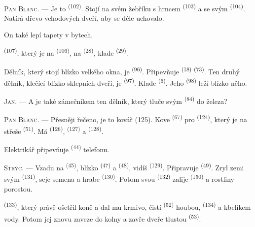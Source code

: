\VUsaut{3.0mm}
\VUsaut{3.0mm}

\textsc{Pan Blanc}. --- Je to  \textsuperscript{(102)}. Stojí na svém žebříku
s hrncem  \textsuperscript{(103)} a se svým 
\textsuperscript{(104)}. Natírá dřevo vchodových dveří, aby se déle uchovalo.

On také lepí tapety v bytech.

 \textsuperscript{(107)}, který je na 
\textsuperscript{(106)}, na  \textsuperscript{(28)}, klade
 \textsuperscript{(29)}.

Dělník, který stojí blízko velkého okna, je  \textsuperscript{(96)}.
Připevňuje  \textsuperscript{(18)} 
\textsuperscript{(73)}. Ten druhý dělník, klečící blízko sklepních dveří, je
 \textsuperscript{(97)}. Klade  \textsuperscript{(6)}.
Jeho  \textsuperscript{(98)} leží blízko něho.

\textsc{Jan}. --- A je také zámečníkem ten dělník, který tluče svým 
\textsuperscript{(84)} do železa?

\textsc{Pan Blanc}. --- Přesněji řečeno, je to kovář (125). Kove 
\textsuperscript{(67)} pro  \textsuperscript{(124)}, který je na střeše
 \textsuperscript{(51)}. Má  \textsuperscript{(126)},
 \textsuperscript{(127)} a
 \textsuperscript{(128)}.

Elektrikář připevňuje  \textsuperscript{(44)}  telefonu.

\VUsaut{3.0mm}

\textsc{Strýc}. --- Vzadu na  \textsuperscript{(45)}, blízko
 \textsuperscript{(47)} a  \textsuperscript{(48)}, vidíš
 \textsuperscript{(129)}. Připravuje 
\textsuperscript{(49)}. Zryl zemi svým  \textsuperscript{(131)}, seje semena a
hrabe  \textsuperscript{(130)}. Potom svou 
\textsuperscript{(132)} zalije  \textsuperscript{(150)} a rostliny porostou.

 \textsuperscript{(133)}, který právě ošetřil koně a dal mu krmivo,
čistí  \textsuperscript{(52)} houbou, 
\textsuperscript{(134)} a kbelíkem vody. Potom jej znovu zaveze do kolny a zavře dveře tlustou
 \textsuperscript{(53)}.

